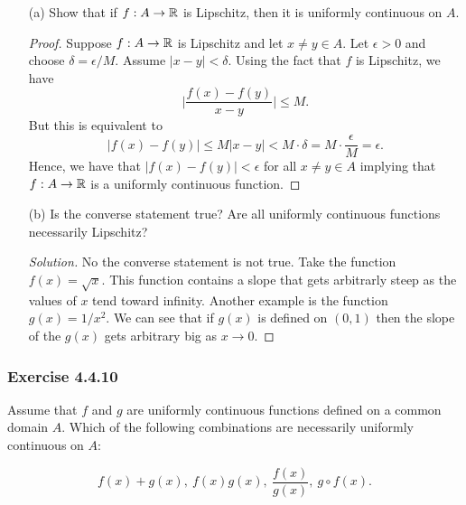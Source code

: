 \begin{enumerate}
    \item[(a)] Show that if \( f: A \to \mathbb{R}  \) is Lipschitz, then it is uniformly continuous on \( A  \).
        \begin{proof}
        Suppose \( f: A \to \mathbb{R}  \) is Lipschitz and let \( x \neq y \in A  \). Let \( \epsilon > 0  \) and choose \( \delta = \epsilon / M  \). Assume \( | x - y  | < \delta  \). Using the fact that \( f  \) is Lipschitz, we have 
        \[ \Big| \frac{ f(x) - f(y)  }{ x - y  }   \Big| \leq M . \]
        But this is equivalent to 
        \[ | f(x) - f(y)  | \leq M | x - y  | < M \cdot \delta = M \cdot \frac{ \epsilon  }{ M  }  = \epsilon. \]
        Hence, we have that \( | f(x) - f(y) | < \epsilon  \) for all \( x \neq y \in A  \) implying that \( f: A \to \mathbb{R}   \) is a uniformly continuous function.
        \end{proof}
    \item[(b)] Is the converse statement true? Are all uniformly continuous functions necessarily Lipschitz?
        \begin{proof}[Solution]
        No the converse statement is not true. Take the function \( f(x) = \sqrt{ x  }  \). This function contains a slope that gets arbitrarly steep as the values of \( x  \) tend toward infinity. Another example is the function \( g(x) = 1 / x^2  \). We can see that if \( g(x)  \) is defined on \( (0,1 ) \) then the slope of the \( g(x)  \) gets arbitrary big as \( x \to 0  \).
        \end{proof}
\end{enumerate}

\subsubsection{Exercise 4.4.10} Assume that \( f \) and \( g  \) are uniformly continuous functions defined on a common domain \( A  \). Which of the following combinations are necessarily uniformly continuous on \( A  \):

\[ f(x) + g(x), ~ f(x)g(x), ~ \frac{ f(x) }{ g(x) }, ~ g \circ f (x).  \]


